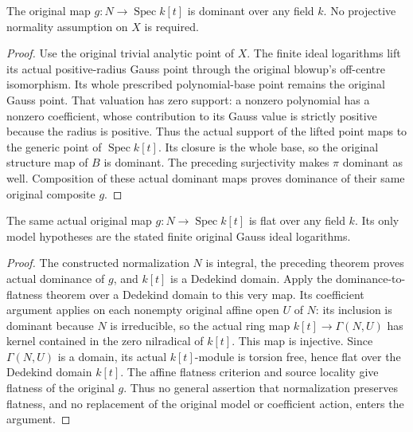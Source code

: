 \begin{theorem}
\label{local:original-normalized-pl-model-dominant-any-field}
\leanok
The original map $g:N\to\operatorname{Spec}k[t]$ is dominant over any field
$k$. No projective normality assumption on $X$ is required.
\end{theorem}
\begin{proof}
Use the original trivial analytic point of $X$. The finite ideal logarithms
lift its actual positive-radius Gauss point through the original blowup's
off-centre isomorphism. Its whole prescribed polynomial-base point remains
the original Gauss point. That valuation has zero support: a nonzero
polynomial has a nonzero coefficient, whose contribution to its Gauss
value is strictly positive because the radius is positive. Thus the actual
support of the lifted point maps to the generic point of
$\operatorname{Spec}k[t]$. Its closure is the whole base, so the original
structure map of $B$ is dominant. The preceding surjectivity makes
$\pi$ dominant as well. Composition of these actual dominant maps proves
dominance of their same original composite $g$.
\end{proof}

\begin{theorem}
\label{local:original-normalized-pl-model-flat-any-field}
\leanok
The same actual original map $g:N\to\operatorname{Spec}k[t]$ is flat over
any field $k$. Its only model hypotheses are the stated finite original
Gauss ideal logarithms.
\end{theorem}
\begin{proof}
The constructed normalization $N$ is integral, the preceding theorem
proves actual dominance of $g$, and $k[t]$ is a Dedekind domain. Apply
the dominance-to-flatness theorem over a Dedekind domain to this very
map. Its coefficient argument applies on each nonempty original affine
open $U$ of $N$: its inclusion is dominant because $N$ is irreducible,
so the actual ring map $k[t]\to\Gamma(N,U)$ has kernel contained in the
zero nilradical of $k[t]$. This map is injective. Since $\Gamma(N,U)$ is
a domain, its actual $k[t]$-module is torsion free, hence flat over the
Dedekind domain $k[t]$. The affine flatness criterion and source locality
give flatness of the original $g$. Thus no general assertion that
normalization preserves flatness, and no replacement of the original
model or coefficient action, enters the argument.
\end{proof}
